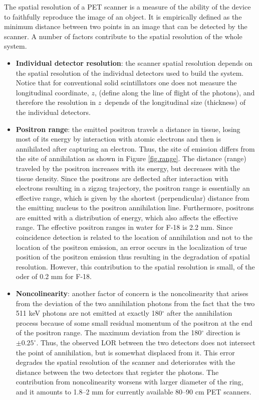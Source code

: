 The spatial resolution of a PET scanner is a measure of the ability of the device to faithfully reproduce the image of an object. It is empirically defined as the minimum distance between two points in an image that can be detected by the scanner. A number of factors contribute to the spatial resolution of the whole system.
\begin{itemize}
\item {\bf Individual detector resolution}: the scanner spatial resolution depends on the spatial resolution of the individual detectors used to build the system. Notice that for conventional solid scintillators one does not measure the longitudinal coordinate, $z$, (define along the line of flight of the photons), and therefore the resolution in $z$~depends of the longitudinal size (thickness) of the individual detectors.   
\item {\bf Positron range}: the emitted positron travels a distance in tissue, losing most of its energy by interaction with atomic electrons and then is annihilated after capturing an electron. Thus, the site of emission differs from the site of annihilation as shown in Figure \ref{fig.range}. The distance (range) traveled by the positron increases with its energy, but decreases with the tissue density. Since the positrons are deflected after interaction with electrons resulting in a zigzag trajectory, the positron range is essentially an effective range, which is given by the shortest (perpendicular) distance from the emitting nucleus to the positron annihilation line. Furthermore, positrons are emitted with a distribution of energy, which also affects the effective range. The effective positron ranges in water for F-18 is 2.2 mm. Since coincidence detection is related to the location of annihilation and not to the location of the positron emission, an error  occurs in the localization of true position of the positron emission thus resulting in the degradation of spatial resolution. However, this contribution to the spatial resolution is small, of the oder of 0.2 mm for F-18.
\item {\bf Noncolinearity}: another factor of concern is the noncolinearity that arises from the deviation of the two annihilation photons from the fact that the two 511 keV photons are not emitted at exactly 180$^\circ$ after the annihilation process because of some small residual momentum of the positron at the end of the positron range. The maximum deviation from the 180$^\circ$ direction is $\pm 0.25^\circ$. Thus, the observed LOR between the two detectors does not intersect the point of annihilation, but is somewhat displaced from it. This error  degrades the spatial resolution of the scanner and deteriorates with the distance between the two detectors that register the photons. The contribution from noncolinearity worsens with larger diameter of the ring, and it amounts to 1.8--2 mm for currently available 80--90 cm PET scanners.
\end{itemize}

